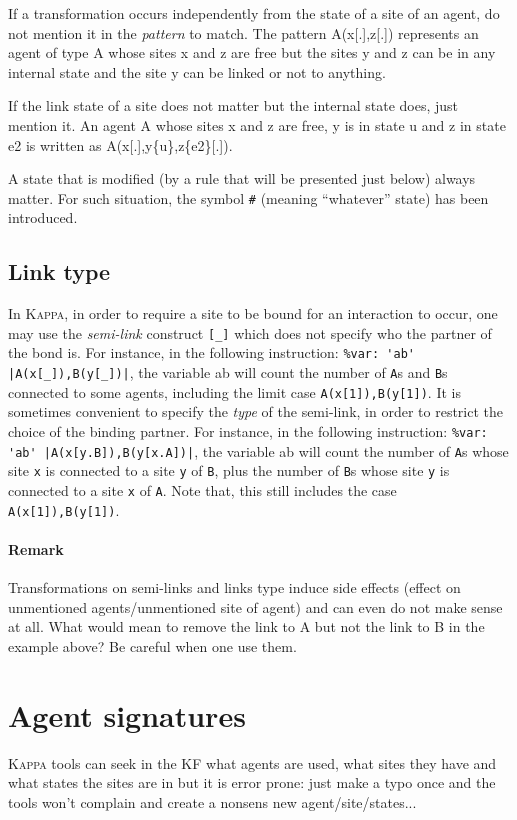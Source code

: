 \documentclass[11pt]{book}
\def\Kappa{\textsc{Kappa}}
\def\ttt#1{\texttt{#1}}
\def\var#1{{\textquotesingle}#1{\textquotesingle}}
\newcommand{\Remark}{\paragraph{Remark}}
\begin{document}
If a transformation occurs independently from the state of a site of
an agent, do not mention it in the \emph{pattern} to match. The pattern
A(x[.],z[.]) represents an agent of type A whose sites x and z are
free but the sites y and z can be in any internal state and the site y
can be linked or not to anything.

If the link state of a site does not matter but the internal state
does, just mention it. An agent A whose sites x and z are free, y
is in state u and z in state e2 is written as
A(x[.],y\{u\},z\{e2\}[.]).

A state that is modified (by a rule that will be presented just below)
always matter. For such situation, the symbol \ttt{\#} (meaning
``whatever'' state) has been introduced.

\subsection{Link type}

In \Kappa{}, in order to require a site to be bound for an
interaction to occur, one may use the
\emph{semi-link} construct \ttt{[\_]} which does not
specify who the partner of the bond is. For instance, in the following
instruction: \lstinline[language=kappa]*%var: 'ab' |A(x[_]),B(y[_])|*,
the variable \var{ab} will count the number of \ttt{A}s and \ttt{B}s
connected to some agents, including the limit case
\ttt{A(x[1]),B(y[1])}. It is sometimes convenient to specify the
\emph{type} of the semi-link, in order to restrict
the choice of the binding partner. For instance, in the following
instruction: \lstinline[language=kappa]*%var: 'ab' |A(x[y.B]),B(y[x.A])|*,
the variable \var{ab} will count the number of
\ttt{A}s whose site \ttt{x} is connected to a site \ttt{y} of \ttt{B},
plus the number of \ttt{B}s whose site \ttt{y} is connected to a site
\ttt{x} of \ttt{A}. Note that, this still includes the case
\ttt{A(x[1]),B(y[1])}.

\Remark{Transformations on semi-links and links type induce side
  effects (effect on unmentioned agents/unmentioned site of agent) and
  can even do not make sense at all. What would mean to remove the link
  to A but not the link to B in the example above? Be careful when
  one use them.}

\section{Agent signatures}\label{sec:sig}
%
\Kappa{} tools can seek in the KF what agents are
used, what sites they have and what states the sites are in but it
is error prone: just make a typo once and the tools won't complain and
create a nonsens new agent/site/states...
\end{document}
